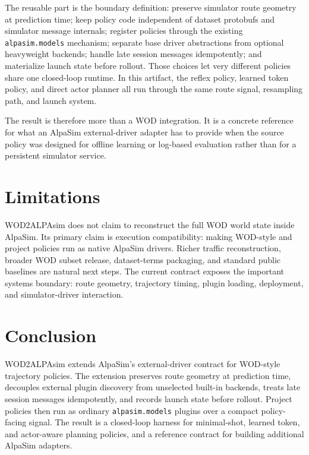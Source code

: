 \documentclass{article}
\begin{document}
The reusable part is the boundary definition: preserve simulator route geometry at
prediction time; keep policy code independent of dataset protobufs and simulator message
internals; register policies through the existing \texttt{alpasim.models} mechanism;
separate base driver abstractions from optional heavyweight backends; handle late session
messages idempotently; and materialize launch state before rollout. Those choices let
very different policies share one closed-loop runtime. In this artifact, the reflex
policy, learned token policy, and direct actor planner all run through the same route
signal, resampling path, and launch system.

The result is therefore more than a WOD integration. It is a concrete reference for what
an AlpaSim external-driver adapter has to provide when the source policy was designed for
offline learning or log-based evaluation rather than for a persistent simulator service.

\section{Limitations}

WOD2ALPAsim does not claim to reconstruct the full WOD world state inside AlpaSim. Its
primary claim is execution compatibility: making WOD-style and project policies run as
native AlpaSim drivers. Richer traffic reconstruction, broader WOD subset release,
dataset-terms packaging, and standard public baselines are natural next steps. The
current contract exposes the important systems boundary: route geometry, trajectory
timing, plugin loading, deployment, and simulator-driver interaction.

\section{Conclusion}

WOD2ALPAsim extends AlpaSim's external-driver contract for WOD-style trajectory policies.
The extension preserves route geometry at prediction time, decouples external plugin
discovery from unselected built-in backends, treats late session messages idempotently,
and records launch state before rollout. Project policies then run as ordinary
\texttt{alpasim.models} plugins over a compact policy-facing signal. The result is a
closed-loop harness for minimal-shot, learned token, and actor-aware planning policies,
and a reference contract for building additional AlpaSim adapters.


\end{document}
